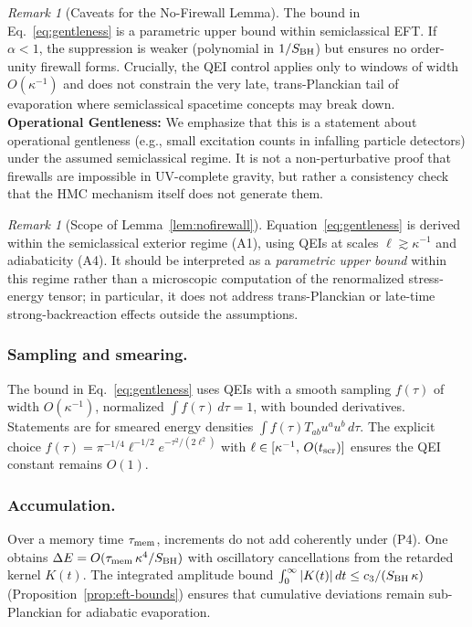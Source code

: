 \documentclass[aps,prd,preprint,onecolumn,superscriptaddress,nofootinbib,longbibliography,floatfix,11pt,showpacs,showkeys]{revtex4-2}
\theoremstyle{plain}
\theoremstyle{definition}
\theoremstyle{remark}
\newtheorem{remark}[theorem]{Remark}
\begin{document}
\begin{remark}[Caveats for the No-Firewall Lemma]
The bound in Eq.~\eqref{eq:gentleness} is a parametric upper bound within semiclassical EFT.
If $\alpha < 1$, the suppression is weaker (polynomial in $1/S_{\rm BH}$) but ensures no order-unity firewall forms.
Crucially, the QEI control applies only to windows of width $O(\kappa^{-1})$ and does not constrain the very late, trans-Planckian tail of evaporation where semiclassical spacetime concepts may break down.
\textbf{Operational Gentleness:} We emphasize that this is a statement about operational gentleness (e.g., small excitation counts in infalling particle detectors) under the assumed semiclassical regime. It is not a non-perturbative proof that firewalls are impossible in UV-complete gravity, but rather a consistency check that the HMC mechanism itself does not generate them.
\end{remark}

\begin{remark}[Scope of Lemma~\ref{lem:nofirewall}]
Equation~\eqref{eq:gentleness} is derived within the semiclassical exterior regime (A1), using QEIs at scales
$\ell\gtrsim\kappa^{-1}$ and adiabaticity (A4). It should be interpreted as a \emph{parametric upper bound} within
this regime rather than a microscopic computation of the renormalized stress-energy tensor; in particular, it does
not address trans-Planckian or late-time strong-backreaction effects outside the assumptions.
\end{remark}


\subsubsection{Sampling and smearing.}
The bound in Eq.~\eqref{eq:gentleness} uses QEIs with a smooth sampling $f(\tau)$ of width $O(\kappa^{-1})$,
normalized $\int f(\tau)\,d\tau=1$, with bounded derivatives. Statements are for smeared energy densities
$\int f(\tau) T_{ab}u^a u^b\,d\tau$. The explicit choice $f(\tau)=\pi^{-1/4}\ell^{-1/2}e^{-\tau^2/(2\ell^2)}$ with $\ell\in[\kappa^{-1},\,O(t_{\rm scr})]$ ensures the QEI constant remains $O(1)$.

\subsubsection{Accumulation.}
Over a memory time $\tau_{\rm mem}$, increments do not add coherently under (P4). One obtains
$\Delta E=O(\tau_{\rm mem}\,\kappa^4/S_{\rm BH})$ with oscillatory cancellations from the retarded kernel $K(t)$. The integrated amplitude bound $\int_0^\infty|K(t)|\,dt\le c_3/(S_{\rm BH}\,\kappa)$ (Proposition~\ref{prop:eft-bounds}) ensures that cumulative deviations remain sub-Planckian for adiabatic evaporation.
\end{document}
